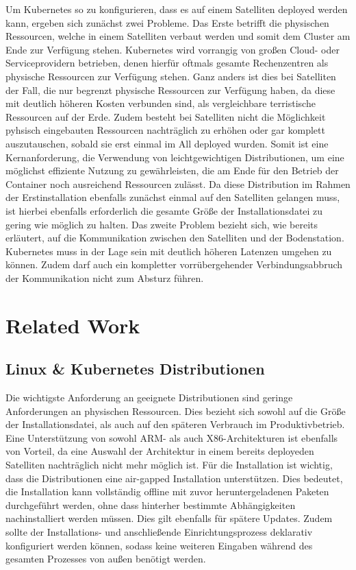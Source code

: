 \documentclass[
  ngerman,
  symmetric,
  cdfont=on,
  numbers=noenddot,
  parskip
]{tudscrreprt}
\begin{document}
Um Kubernetes so zu konfigurieren, dass es auf einem Satelliten deployed werden kann, ergeben sich zunächst zwei Probleme. Das Erste betrifft die physischen Ressourcen, welche in einem Satelliten verbaut werden und somit dem Cluster am Ende zur Verfügung stehen. Kubernetes wird vorrangig von großen Cloud- oder Serviceprovidern betrieben, denen hierfür oftmals gesamte Rechenzentren als physische Ressourcen zur Verfügung stehen. Ganz anders ist dies bei Satelliten der Fall, die nur begrenzt physische Ressourcen zur Verfügung haben, da diese mit deutlich höheren Kosten verbunden sind, als vergleichbare terristische Ressourcen auf der Erde. Zudem besteht bei Satelliten nicht die Möglichkeit pyhsisch eingebauten Ressourcen nachträglich zu erhöhen oder gar komplett auszutauschen, sobald sie erst einmal im All deployed wurden. Somit ist eine Kernanforderung, die Verwendung von leichtgewichtigen Distributionen, um eine möglichst effiziente Nutzung zu gewährleisten, die am Ende für den Betrieb der Container noch ausreichend Ressourcen zulässt. Da diese Distribution im Rahmen der Erstinstallation ebenfalls zunächst einmal auf den Satelliten gelangen muss, ist hierbei ebenfalls erforderlich die gesamte Größe der Installationsdatei zu gering wie möglich zu halten.
Das zweite Problem bezieht sich, wie bereits erläutert, auf die Kommunikation zwischen den Satelliten und der Bodenstation. Kubernetes muss in der Lage sein mit deutlich höheren Latenzen umgehen zu können. Zudem darf auch ein kompletter vorrübergehender Verbindungsabbruch der Kommunikation nicht zum Absturz führen. 


\section{Related Work}
\subsection{Linux \& Kubernetes Distributionen}
Die wichtigste Anforderung an geeignete Distributionen sind geringe Anforderungen an physischen Ressourcen. Dies bezieht sich sowohl auf die Größe der Installationsdatei, als auch auf den späteren Verbrauch im Produktivbetrieb. Eine Unterstützung von sowohl ARM- als auch X86-Architekturen ist ebenfalls von Vorteil, da eine Auswahl der Architektur in einem bereits deployeden Satelliten nachträglich nicht mehr möglich ist. Für die Installation ist wichtig, dass die Distributionen eine air-gapped Installation unterstützen. Dies bedeutet, die Installation kann vollständig offline mit zuvor heruntergeladenen Paketen durchgeführt werden, ohne dass hinterher bestimmte Abhängigkeiten nachinstalliert werden müssen. Dies gilt ebenfalls für spätere Updates. Zudem sollte der Installations- und anschließende Einrichtungsprozess deklarativ konfiguriert werden können, sodass keine weiteren Eingaben während des gesamten Prozesses von außen benötigt werden. 
\end{document}

